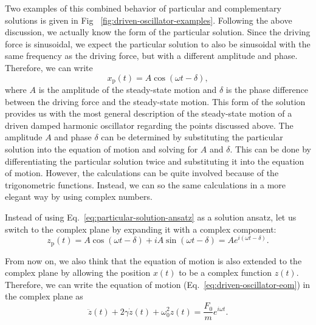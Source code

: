 \documentclass[12pt]{article}
\begin{document}
Two examples of this combined behavior of particular and complementary solutions is given in Fig~ \ref{fig:driven-oscillator-examples}. Following the above discussion, we actually know the form of the particular solution. Since the driving force is sinusoidal, we expect the particular solution to also be sinusoidal with the same frequency as the driving force, but with a different amplitude and phase. Therefore, we can write
\begin{equation}
    x_\text{p}(t)=A\cos(\omega t-\delta),
    \label{eq:particular-solution-ansatz}
\end{equation}
where $A$ is the amplitude of the steady-state motion and $\delta$ is the phase difference between the driving force and the steady-state motion. This form of the solution provides us with the most general description of the steady-state motion of a driven damped harmonic oscillator regarding the points discussed above. The amplitude $A$ and phase $\delta$ can be determined by substituting the particular solution into the equation of motion and solving for $A$ and $\delta$. This can be done by differentiating the particular solution twice and substituting it into the equation of motion. However, the calculations can be quite involved because of the trigonometric functions. Instead, we can so the same calculations in a more elegant way by using complex numbers. 

Instead of using Eq.~\eqref{eq:particular-solution-ansatz} as a solution ansatz, let us switch to the complex plane by expanding it with a complex component:
\begin{equation}
    z_\text{p}(t)=A\cos(\omega t-\delta)+iA\sin(\omega t-\delta)=Ae^{i(\omega t-\delta)}.
    \label{eq:particular-solution-complex}
\end{equation}

From now on, we also think that the equation of motion is also extended to the complex plane by allowing the position $x(t)$ to be a complex function $z(t)$. Therefore, we can write the equation of motion (Eq.~\eqref{eq:driven-oscillator-eom}) in the complex plane as
\begin{equation}
    \ddot{z}(t)+2\gamma\dot{z}(t)+\omega_0^2 z(t)=\frac{F_0}{m}e^{i\omega t}.
\end{equation}
\end{document}

